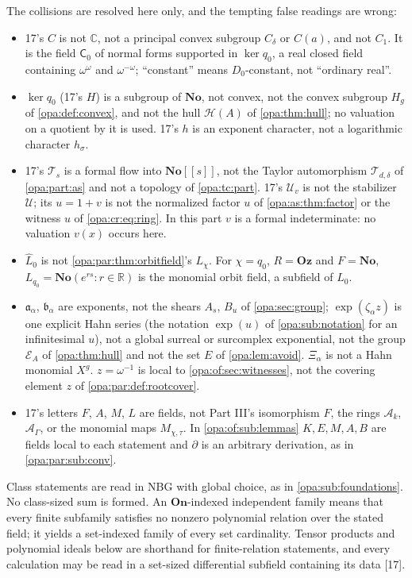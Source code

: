 \documentclass[11pt,oneside]{article}
\numberwithin{equation}{section}
\theoremstyle{definition}
\theoremstyle{remark}
\newcommand{\No}{\mathbf{No}}
\newcommand{\Oz}{\mathbf{Oz}}
\newcommand{\R}{\mathbb R}
\newcommand{\C}{\mathbb C}
\newcommand{\Ak}{\mathcal A_k}
\newcommand{\UU}{\mathcal U}
\newcommand{\EE}{\mathcal E}
\newcommand{\HH}{\mathcal H}
\newcommand{\src}[1]{\textup{\textsf{\small[#1]}}}
\newcommand{\On}{\mathbf{On}}
\begin{document}
The collisions are resolved here only, and the tempting false readings are wrong:
\begin{itemize}[itemsep=1pt]
\item 17's $C$ is not $\C$, not a principal convex subgroup $C_\delta$ or $C(a)$, and not $C_1$. It is the field
$\mathsf C_0$ of normal forms supported in $\ker q_0$, a real closed field containing $\omega^\omega$ and
$\omega^{-\omega}$; ``constant'' means $D_0$-constant, not ``ordinary real''.
\item $\ker q_0$ (17's $H$) is a subgroup of $\No$, not convex, not the convex subgroup $H_g$ of
\cref{opa:def:convex}, and not the hull $\HH(A)$ of \cref{opa:thm:hull}; no valuation on a quotient by it is used.
17's $h$ is an exponent character, not a logarithmic character $h_\sigma$.
\item 17's $\mathcal T_s$ is a formal flow into $\No[[s]]$, not the Taylor automorphism $\mathcal T_{d,\delta}$ of
\cref{opa:part:as} and not a topology of \cref{opa:tc:part}. 17's $\mathcal U_v$ is not the stabilizer $\UU$; its $u=1+v$ is
not the normalized factor $u$ of \cref{opa:as:thm:factor} or the witness $u$ of \eqref{opa:cr:eq:ring}. In this part $v$
is a formal indeterminate: no valuation $v(x)$ occurs here.
\item $\widehat L_0$ is not \cref{opa:par:thm:orbitfield}'s $L_\chi$. For $\chi=q_0$, $R=\Oz$ and $F=\No$, $L_{q_0}=\No(e^{rs}:r\in\R)$
is the monomial orbit field, a subfield of $\widehat L_0$.
\item $\mathfrak a_\alpha$, $\mathfrak b_\alpha$ are exponents, not the shears $A_s$, $B_u$ of \cref{opa:sec:group};
$\exp(\zeta_\alpha z)$ is one explicit Hahn series (the notation $\exp(u)$ of \cref{opa:sub:notation} for an
infinitesimal $u$), not a global surreal or surcomplex exponential, not the group $\EE_A$ of \cref{opa:thm:hull} and not
the set $E$ of \cref{opa:lem:avoid}. $\Xi_\alpha$ is not a Hahn monomial $X^g$. $z=\omega^{-1}$ is local to
\cref{opa:of:sec:witnesses}, not the covering element $z$ of \cref{opa:par:def:rootcover}.
\item 17's letters $F$, $A$, $M$, $L$ are fields, not Part III's isomorphism $F$, the rings $\Ak$, $\mathcal A_\Gamma$, or
the monomial maps $M_{\chi,\tau}$. In \cref{opa:of:sub:lemmas} $K,E,M,A,B$ are fields local to each statement and $\partial$ is
an arbitrary derivation, as in \cref{opa:par:sub:conv}.
\end{itemize}
Class statements are read in NBG with global choice, as in \cref{opa:sub:foundations}. No class-sized sum is formed. An
$\On$-indexed independent family means that every finite subfamily satisfies no nonzero polynomial relation over the
stated field; it yields a set-indexed family of every set cardinality. Tensor products and polynomial ideals below are
shorthand for finite-relation statements, and every calculation may be read in a set-sized differential subfield
containing its data \src{17}.
\end{document}
